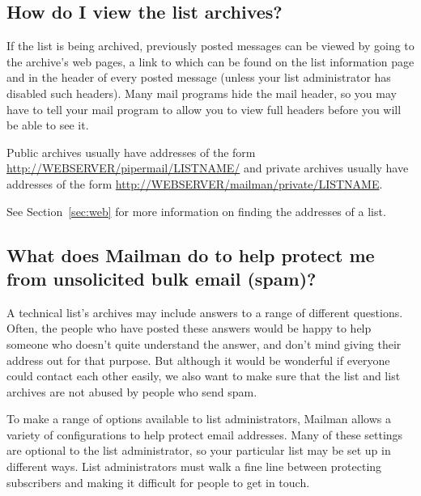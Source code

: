 \documentclass{howto}
\begin{document}
\subsection{How do I view the list archives?}
If the list is being archived, previously posted messages can be viewed by
going to the archive's web pages, a link to which can be found on the list
information page and in the  header of every posted
message (unless your list administrator has disabled such headers).
Many mail programs hide the  mail header, so you may
have to tell your mail program to allow you to view full headers before you
will be able to see it.

Public archives usually have addresses of the form 
\url{http://WEBSERVER/pipermail/LISTNAME/} and private archives usually
have addresses of the form \url{http://WEBSERVER/mailman/private/LISTNAME}.

See Section~\ref{sec:web} for more information on finding the addresses of a
list.

\subsection{What does Mailman do to help protect me from unsolicited bulk email
(spam)?\label{sec:antispam}}

A technical list's archives may include answers to a range of
different questions.  Often, the people who have posted these answers would
be happy to help someone who doesn't quite understand the answer, and don't
mind giving their address out for that purpose.  But
although it would be wonderful if everyone could contact each other easily,
we also want to make sure that the list and list archives are not abused by 
people who send spam.  

To make a range of options available to list administrators, Mailman allows
a variety of configurations to help protect email addresses.  
Many of these settings are optional to the list administrator, so your
particular list may be set up in different ways.  List administrators 
must walk a fine line between protecting subscribers and making it difficult
for people to get in touch.  
\end{document}
